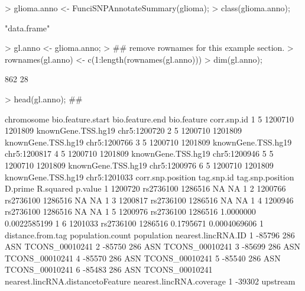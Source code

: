 \documentclass[a4paper]{article}
\begin{document}
\begin{Schunk}
\begin{Sinput}
> glioma.anno <- FunciSNPAnnotateSummary(glioma);
> class(glioma.anno);
\end{Sinput}
\begin{Soutput}
[1] "data.frame"
\end{Soutput}
\begin{Sinput}
> gl.anno <- glioma.anno;
> ## remove rownames for this example section.
> rownames(gl.anno) <- c(1:length(rownames(gl.anno)))
> dim(gl.anno);
\end{Sinput}
\begin{Soutput}
[1] 862  28
\end{Soutput}
\begin{Sinput}
> head(gl.anno); ## 
\end{Sinput}
\begin{Soutput}
  chromosome bio.feature.start bio.feature.end        bio.feature  corr.snp.id
1          5           1200710         1201809 knownGene.TSS.hg19 chr5:1200720
2          5           1200710         1201809 knownGene.TSS.hg19 chr5:1200766
3          5           1200710         1201809 knownGene.TSS.hg19 chr5:1200817
4          5           1200710         1201809 knownGene.TSS.hg19 chr5:1200946
5          5           1200710         1201809 knownGene.TSS.hg19 chr5:1200976
6          5           1200710         1201809 knownGene.TSS.hg19 chr5:1201033
  corr.snp.position tag.snp.id tag.snp.position   D.prime    R.squared p.value
1           1200720  rs2736100          1286516        NA           NA       1
2           1200766  rs2736100          1286516        NA           NA       1
3           1200817  rs2736100          1286516        NA           NA       1
4           1200946  rs2736100          1286516        NA           NA       1
5           1200976  rs2736100          1286516 1.0000000 0.0022585199       1
6           1201033  rs2736100          1286516 0.1795671 0.0004069606       1
  distance.from.tag population.count population nearest.lincRNA.ID
1            -85796              286        ASN     TCONS_00010241
2            -85750              286        ASN     TCONS_00010241
3            -85699              286        ASN     TCONS_00010241
4            -85570              286        ASN     TCONS_00010241
5            -85540              286        ASN     TCONS_00010241
6            -85483              286        ASN     TCONS_00010241
  nearest.lincRNA.distancetoFeature nearest.lincRNA.coverage
1                            -39302                 upstream

\end{Soutput}
\end{Schunk}
\end{document}
